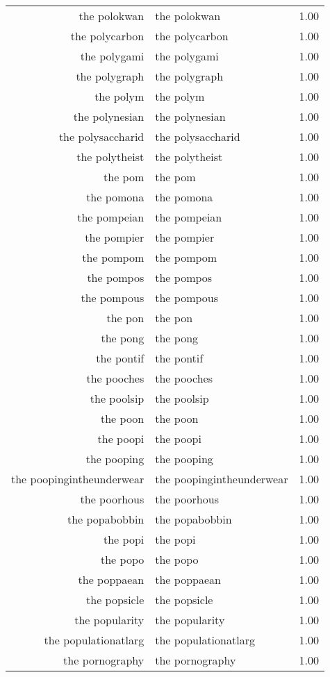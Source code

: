 \begin{table}[ht]
\begin{tabular}{rlr}
  the polokwan & the polokwan & 1.00 \\ 
  the polycarbon & the polycarbon & 1.00 \\ 
  the polygami & the polygami & 1.00 \\ 
  the polygraph & the polygraph & 1.00 \\ 
  the polym & the polym & 1.00 \\ 
  the polynesian & the polynesian & 1.00 \\ 
  the polysaccharid & the polysaccharid & 1.00 \\ 
  the polytheist & the polytheist & 1.00 \\ 
  the pom & the pom & 1.00 \\ 
  the pomona & the pomona & 1.00 \\ 
  the pompeian & the pompeian & 1.00 \\ 
  the pompier & the pompier & 1.00 \\ 
  the pompom & the pompom & 1.00 \\ 
  the pompos & the pompos & 1.00 \\ 
  the pompous & the pompous & 1.00 \\ 
  the pon & the pon & 1.00 \\ 
  the pong & the pong & 1.00 \\ 
  the pontif & the pontif & 1.00 \\ 
  the pooches & the pooches & 1.00 \\ 
  the poolsip & the poolsip & 1.00 \\ 
  the poon & the poon & 1.00 \\ 
  the poopi & the poopi & 1.00 \\ 
  the pooping & the pooping & 1.00 \\ 
  the poopingintheunderwear & the poopingintheunderwear & 1.00 \\ 
  the poorhous & the poorhous & 1.00 \\ 
  the popabobbin & the popabobbin & 1.00 \\ 
  the popi & the popi & 1.00 \\ 
  the popo & the popo & 1.00 \\ 
  the poppaean & the poppaean & 1.00 \\ 
  the popsicle & the popsicle & 1.00 \\ 
  the popularity & the popularity & 1.00 \\ 
  the populationatlarg & the populationatlarg & 1.00 \\ 
  the pornography & the pornography & 1.00 \\ 

\end{tabular}
\end{table}
